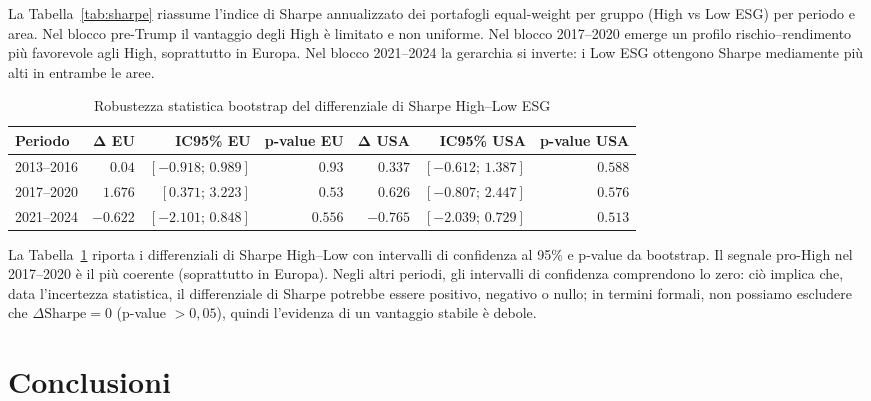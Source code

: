 \documentclass[12pt,a4paper]{article}
\begin{document}
La Tabella~\ref{tab:sharpe} riassume l'indice di Sharpe annualizzato dei portafogli equal-weight per gruppo (High vs Low ESG) per periodo e area. Nel blocco pre-Trump il vantaggio degli High è limitato e non uniforme. Nel blocco 2017--2020 emerge un profilo rischio--rendimento più favorevole agli High, soprattutto in Europa. Nel blocco 2021--2024 la gerarchia si inverte: i Low ESG ottengono Sharpe mediamente più alti in entrambe le aree.

\begin{table}[H]
\centering
\caption{Robustezza statistica bootstrap del differenziale di Sharpe High--Low ESG}
\label{tab:bootstrap}
\footnotesize
\setlength{\tabcolsep}{3pt}
\begin{tabular}{lrrrrrr}
\toprule
\textbf{Periodo} & $\boldsymbol{\Delta}$\textbf{ EU} & \textbf{IC95\% EU} & \textbf{p-value EU} & $\boldsymbol{\Delta}$\textbf{ USA} & \textbf{IC95\% USA} & \textbf{p-value USA} \\
\midrule
2013--2016 & $0.04$ & $[-0.918;\,0.989]$ & $0.93$ & $0.337$ & $[-0.612;\,1.387]$ & $0.588$ \\
2017--2020 & $1.676$ & $[0.371;\,3.223]$ & $0.53$ & $0.626$ & $[-0.807;\,2.447]$ & $0.576$ \\
2021--2024 & $-0.622$ & $[-2.101;\,0.848]$ & $0.556$ & $-0.765$ & $[-2.039;\,0.729]$ & $0.513$ \\
\bottomrule
\end{tabular}
\end{table}

La Tabella~\ref{tab:bootstrap} riporta i differenziali di Sharpe High--Low con intervalli di confidenza al 95\% e p-value da bootstrap. Il segnale pro-High nel 2017--2020 è il più coerente (soprattutto in Europa). Negli altri periodi, gli intervalli di confidenza comprendono lo zero: ciò implica che, data l'incertezza statistica, il differenziale di Sharpe potrebbe essere positivo, negativo o nullo; in termini formali, non possiamo escludere che $\Delta\mathrm{Sharpe}=0$ (p-value $>0{,}05$), quindi l'evidenza di un vantaggio stabile è debole.

\section*{Conclusioni}
\end{document}

